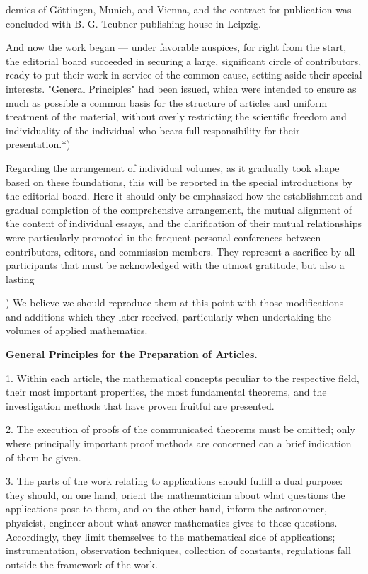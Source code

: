 \thispagestyle{fancy}

\vspace{0.5cm}

demies of Göttingen, Munich, and Vienna, and the contract for publication was concluded with B. G. Teubner publishing house in Leipzig.

And now the work began — under favorable auspices, for right from the start, the editorial board succeeded in securing a large, significant circle of contributors, ready to put their work in service of the common cause, setting aside their special interests. "General Principles" had been issued, which were intended to ensure as much as possible a common basis for the structure of articles and uniform treatment of the material, without overly restricting the scientific freedom and individuality of the individual who bears full responsibility for their presentation.*)

Regarding the arrangement of individual volumes, as it gradually took shape based on these foundations, this will be reported in the special introductions by the editorial board. Here it should only be emphasized how the establishment and gradual completion of the comprehensive arrangement, the mutual alignment of the content of individual essays, and the clarification of their mutual relationships were particularly promoted in the frequent personal conferences between contributors, editors, and commission members. They represent a sacrifice by all participants that must be acknowledged with the utmost gratitude, but also a lasting

\vfill
\leftline{\rule{2in}{0.4pt}}
\vspace{0.2cm}
{\footnotesize *) We believe we should reproduce them at this point with those modifications and additions which they later received, particularly when undertaking the volumes of applied mathematics.

\vspace{0.25cm}
\textbf{General Principles for the Preparation of Articles.}
\vspace{0.25cm}

1. Within each article, the mathematical concepts peculiar to the respective field, their most important properties, the most fundamental theorems, and the investigation methods that have proven fruitful are presented.

2. The execution of proofs of the communicated theorems must be omitted; only where principally important proof methods are concerned can a brief indication of them be given.

3. The parts of the work relating to applications should fulfill a dual purpose: they should, on one hand, orient the mathematician about what questions the applications pose to them, and on the other hand, inform the astronomer, physicist, engineer about what answer mathematics gives to these questions. Accordingly, they limit themselves to the mathematical side of applications; instrumentation, observation techniques, collection of constants, regulations fall outside the framework of the work.

}
